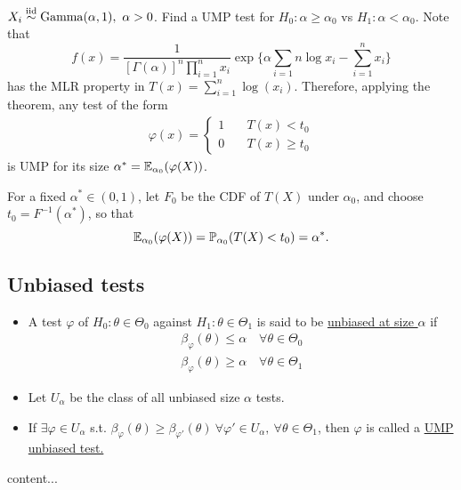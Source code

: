 \begin{exap}
	$X_i \SimIID \mathrm{Gamma}(\alpha, 1),\ \alpha>0$. Find a UMP test for $H_0: \alpha\geq \alpha_0$ vs $H_1: \alpha< \alpha_0$. Note that 
	$$f(x) = \frac{1}{ [\Gamma(\alpha)]^n \prod_{i=1}^n x_i }\exp \big \{   \alpha \sum_{i=1}{n}\log x_i - \sum_{i=1}^n x_i \big \}$$
	has the MLR property in $T(x) = \sum_{i=1}^n \log(x_i)$. Therefore, applying the theorem, any test of the form 
	\begin{align*}
	\varphi(x) = \begin{cases}
	1 &\quad T(x) < t_0 \\
	0 &\quad T(x) \geq t_0
	\end{cases}
	\end{align*}
	is UMP for its size $\alpha^\ast = \mathbb{E}_{\alpha_0}( \varphi(X) )$.
	
	For a fixed $\alpha^\ast \in (0,1)$, let $F_0$ be the CDF of $T(X)$ under $\alpha_0$, and choose $t_0 = F^{-1}(\alpha^\ast)$, so that 
	$$\mathbb{E}_{\alpha_0}( \varphi(X) ) = \mathbb{P}_{\alpha_0} (T(X) < t_0) = \alpha^\ast.$$ 
\end{exap}
 
\subsection{Unbiased tests}
\begin{mydef}\textbf{ }
	\begin{itemize}
		\item A test $\varphi$ of $H_0: \theta \in \Theta_0$ against $H_1: \theta \in \Theta_1$ is said to be \uline{unbiased at size $\alpha$} if 
		\begin{align*}
		\beta_\varphi (\theta) \leq \alpha \quad \forall \theta \in \Theta_0\\
		\beta_\varphi (\theta) \geq \alpha \quad \forall \theta \in \Theta_1
		\end{align*}
		
		\item Let $U_\alpha$ be the class of all unbiased size $\alpha$ tests.
		
		\item If $\exists \varphi \in U_\alpha$ s.t. $\beta_\varphi (\theta) \geq \beta_{\varphi'}(\theta) \ \forall \varphi' \in U_\alpha,\ \forall \theta \in \Theta_1$, then $\varphi$ is called a \uline{UMP unbiased test.}
	\end{itemize}
\end{mydef}
 
\begin{exap}
	content...
\end{exap}
 
